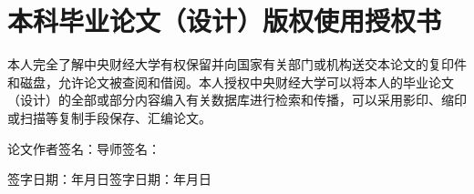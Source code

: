 \chapter*{本科毕业论文（设计）版权使用授权书}

本人完全了解中央财经大学有权保留并向国家有关部门或机构送交本论文的复印件和磁盘，允许论文被查阅和借阅。本人授权中央财经大学可以将本人的毕业论文（设计）的全部或部分内容编入有关数据库进行检索和传播，可以采用影印、缩印或扫描等复制手段保存、汇编论文。

\vspace{44bp}
\noindent 论文作者签名：\hspace*{18em}导师签名：

\vspace{22bp}
\noindent 签字日期：\hspace*{2em}年\hspace*{1em}月\hspace*{1em}日\hspace*{13em}签字日期：\hspace*{2em}年\hspace*{1em}月\hspace*{1em}日
